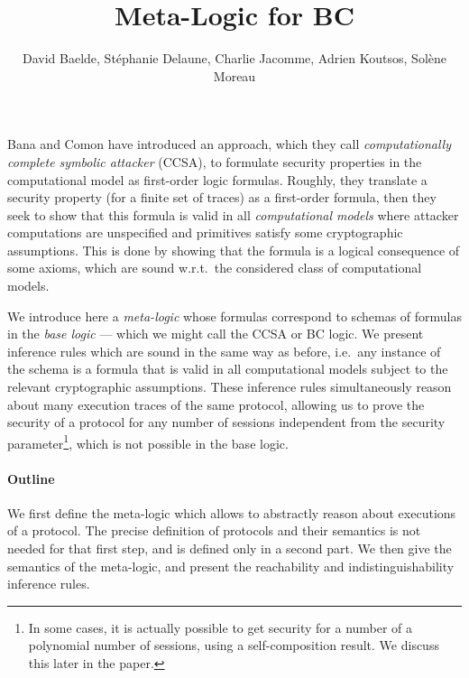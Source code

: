 \documentclass[a4paper]{article}
\theoremstyle{remark}
\begin{document}
\title{Meta-Logic for BC}

\author{David Baelde, Stéphanie Delaune,
  Charlie Jacomme, Adrien Koutsos, Solène Moreau}

\maketitle

\vfill

\tableofcontents

\vfill

Bana and Comon have introduced an approach, which they call
\emph{computationally complete symbolic attacker} (CCSA),
to formulate security properties in the computational model as first-order
logic formulas. Roughly, they translate a security property (for a finite set
of traces) as a first-order formula, then they seek to show that this formula
is valid in all \emph{computational models} where attacker computations
are unspecified and primitives satisfy some cryptographic assumptions. This is
done by showing that the formula is a logical consequence of
some axioms, which are sound w.r.t.\ the considered class of computational
models.

We introduce here a \emph{meta-logic} whose formulas correspond to schemas
of formulas in the \emph{base logic}
--- which we might call the CCSA or BC logic.
We present inference rules which are sound in the same way as before,
i.e.\ any instance of the schema is a formula that is valid in all
computational models subject to the relevant cryptographic assumptions.
These inference rules simultaneously reason about many execution
traces of the same protocol, allowing us to prove the security of a
protocol for any number of sessions independent from the security
parameter\footnote{In some cases, it is actually possible to get security for a number of a polynomial number of sessions, using a self-composition result. We discuss this later in the paper.}, which is not possible in the base logic.

\paragraph{Outline}
We first define the meta-logic which allows to  abstractly reason about
executions of a protocol. The precise definition of protocols and their
semantics is not needed for that first step, and is defined only in a
second part. We then give the semantics of the meta-logic, and present the reachability and indistinguishability inference rules.














\end{document}
